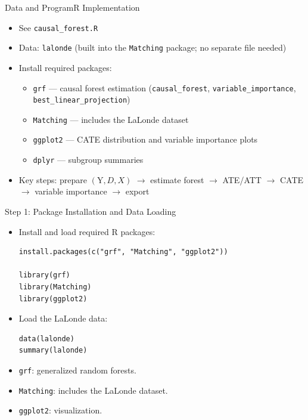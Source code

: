 \documentclass[hyperref={pdfpagelabels=false}]{beamer}
\begin{document}
\begin{frame}{Data and Program}{R Implementation}
\begin{itemize}
  \item See \texttt{causal\_forest.R}
  \vspace{0.2cm}
  \item Data: \texttt{lalonde} (built into the \texttt{Matching} package; no separate file needed)
  \vspace{0.2cm}
  \item Install required packages:
  \begin{itemize}
    \vspace{0.1cm}
    \item \texttt{grf} --- causal forest estimation (\texttt{causal\_forest}, \texttt{variable\_importance}, \texttt{best\_linear\_projection})
    \vspace{0.1cm}
    \item \texttt{Matching} --- includes the LaLonde dataset
    \vspace{0.1cm}
    \item \texttt{ggplot2} --- CATE distribution and variable importance plots
    \vspace{0.1cm}
    \item \texttt{dplyr} --- subgroup summaries
  \end{itemize}
  \vspace{0.2cm}
  \item Key steps: prepare $(\mathrm{Y}, D, X)$ $\to$ estimate forest $\to$ ATE/ATT $\to$ CATE $\to$ variable importance $\to$ export
\end{itemize}
\end{frame}

\begin{frame}[fragile]{Step 1: Package Installation and Data Loading}
\begin{itemize}
  \item Install and load required R packages:
\begin{lstlisting}[style=r-style]
install.packages(c("grf", "Matching", "ggplot2"))

library(grf)
library(Matching)
library(ggplot2)
\end{lstlisting}
  \vspace{0.1cm}
  \item Load the LaLonde data:
\begin{lstlisting}[style=r-style]
data(lalonde)
summary(lalonde)
\end{lstlisting}
  \vspace{0.1cm}
  \item \texttt{grf}: generalized random forests.
  \item \texttt{Matching}: includes the LaLonde dataset.
  \item \texttt{ggplot2}: visualization.
\end{itemize}
\end{frame}
\end{document}
